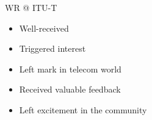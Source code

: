 \documentclass[compress,red]{beamer}
\begin{document}
\begin{frame}{WR @ ITU-T}

    \begin{itemize}
	\item Well-received 
	\item Triggered interest 
	\item Left mark in telecom world
	\item Received valuable feedback 
	\item Left excitement in the community
    \end{itemize}


\end{frame}
\end{document}
